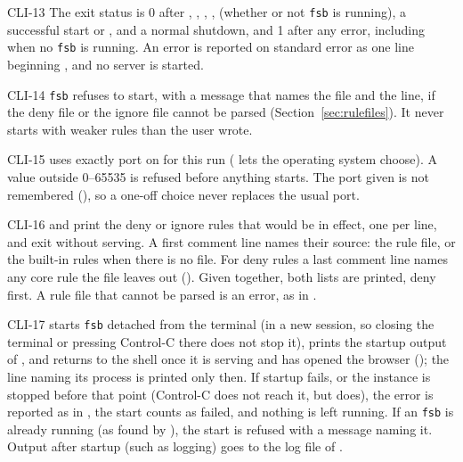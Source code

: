 \begin{req}{CLI-13}
The exit status is 0 after , , ,
,  (whether or not \texttt{fsb} is running), a
successful  start or , and a normal shutdown, and 1
after any error, including  when no \texttt{fsb} is running.  An error is reported on standard error as one line beginning
, and no server is started.
\end{req}

\begin{req}{CLI-14}
\texttt{fsb} refuses to start, with a message that names the file and the line, if
the deny file or the ignore file cannot be parsed
(Section~\ref{sec:rulefiles}).  It never starts with weaker rules than the user wrote.
\end{req}

\begin{req}{CLI-15}
 uses exactly port  on  for this run
( lets the operating system choose).  A value outside 0--65535 is refused
before anything starts.  The port given is not remembered (), so a one-off
choice never replaces the usual port.
\end{req}

\begin{req}{CLI-16}
 and  print the deny or ignore rules that
would be in effect, one per line, and exit without serving.  A first comment line
names their source: the rule file, or the built-in rules when there is no file.  For
deny rules a last comment line names any core rule the file leaves out
().  Given together, both lists are printed, deny first.  A rule file
that cannot be parsed is an error, as in .
\end{req}

\begin{req}{CLI-17}
 starts \texttt{fsb} detached from the terminal (in a new
session, so closing the terminal or pressing Control-C there does not stop it),
prints the startup output of , and returns to the shell once it is
serving and has opened the browser (); the line naming its process is
printed only then.  If startup fails, or the instance is stopped before that point
(Control-C does not reach it, but  does), the error is reported as
in , the start counts as failed, and nothing is left running.  If an \texttt{fsb} is already running (as found by ), the
start is refused with a message naming it.  Output after startup (such as
 logging) goes to the log file of .
\end{req}

